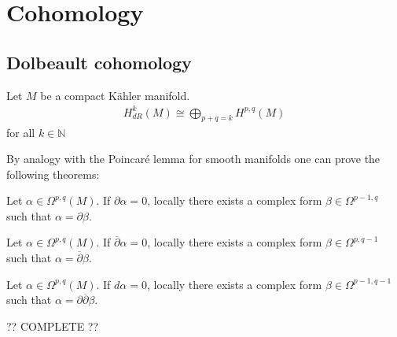 \section{Cohomology}
\subsection{Dolbeault cohomology}

    \begin{theorem}
        Let $M$ be a compact K\"ahler manifold.
        \begin{gather}
            H^k_{dR}(M)\cong\bigoplus_{p+q=k}H^{p,q}(M)
        \end{gather}
        for all $k\in\mathbb{N}$
    \end{theorem}

    By analogy with the Poincar\'e lemma for smooth manifolds one can prove the following theorems:
    \begin{theorem}
        Let $\alpha\in\Omega^{p,q}(M)$. If $\partial\alpha = 0$, locally there exists a complex form $\beta\in\Omega^{p-1,q}$ such that $\alpha = \partial\beta$.
    \end{theorem}
    \begin{theorem}
        Let $\alpha\in\Omega^{p,q}(M)$. If $\overline{\partial}\alpha = 0$, locally there exists a complex form $\beta\in\Omega^{p,q-1}$ such that $\alpha = \overline{\partial}\beta$.
    \end{theorem}
    \begin{theorem}\label{complex:del_delbar_lemma}
        Let $\alpha\in\Omega^{p,q}(M)$. If $d\alpha = 0$, locally there exists a complex form $\beta\in\Omega^{p-1,q-1}$ such that $\alpha = \partial\overline{\partial}\beta$.
    \end{theorem}

    ?? COMPLETE ??